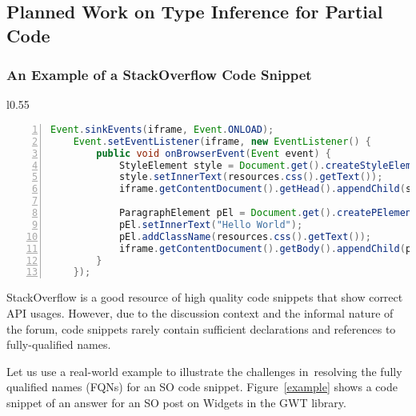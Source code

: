\subsection{Planned Work on Type Inference for Partial Code}
\label{sec:statype}

\subsubsection{An Example of a StackOverflow Code Snippet}

\begin{wrapfigure}{l}{0.55\textwidth}
\begin{lstlisting}[basicstyle=\scriptsize\sffamily, stepnumber=1, numbers=left, numbersep=-6pt, framexleftmargin=0mm, framexrightmargin=0mm, language=Java, emph ={Event,sinkEvents,iframe,setEventListener,EventListener,StyleElement,Document,get,createStyleElement,setInnerText,resources,css,getText,getContentDocument,getHead,getBody,appendChild,ParagraphElement,createPElement,addClassName,whatever}]
    Event.sinkEvents(iframe, Event.ONLOAD);
    Event.setEventListener(iframe, new EventListener() {
        public void onBrowserEvent(Event event) {
            StyleElement style = Document.get().createStyleElement();
            style.setInnerText(resources.css().getText());
            iframe.getContentDocument().getHead().appendChild(style);

            ParagraphElement pEl = Document.get().createPElement();
            pEl.setInnerText("Hello World");
            pEl.addClassName(resources.css().getText());
            iframe.getContentDocument().getBody().appendChild(pEl);
        }
    });
\end{lstlisting}
\vspace{-0.1in}
\caption{StackOverflow post \#34595450 on GWT Widgets~\cite{soexample}}
\label{example}
\end{wrapfigure}

StackOverflow is a good resource of high quality code snippets that
show correct API usages. However, due to the discussion context and
the informal nature of the forum, code snippets rarely contain
sufficient declarations and references to fully-qualified names.


Let us use a real-world example to illustrate the 
challenges in~resolving 
the fully qualified names (FQNs) 
for an SO code snippet. Figure~\ref{example} shows a
code snippet of an answer for an SO post
on Widgets in the GWT library. 

